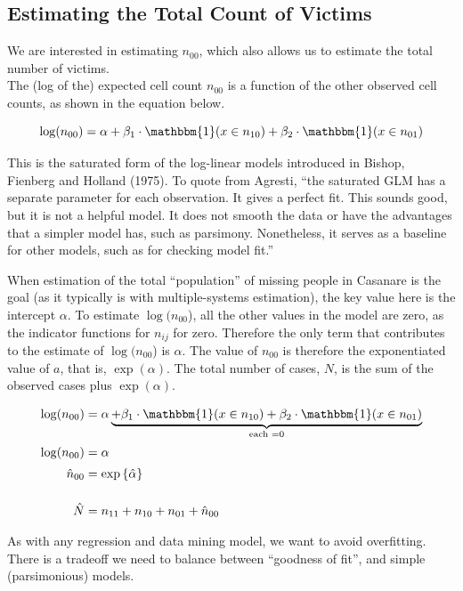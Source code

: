 \documentclass[]{article}
\begin{document}
\hypertarget{estimating-the-total-count-of-victims}{%
\subsection{Estimating the Total Count of
Victims}\label{estimating-the-total-count-of-victims}}

We are interested in estimating \(n_{00}\), which also allows us to
estimate the total number of victims.\\
The (log of the) expected cell count \(n_{00}\) is a function of the
other observed cell counts, as shown in the equation below.

\[
\log(n_{00}) = \alpha 
+ \beta_1 \cdot \mathbbm{1}(x\in n_{10}) 
+ \beta_2 \cdot \mathbbm{1}(x\in n_{01}) 
\]

This is the saturated form of the log-linear models introduced in
Bishop, Fienberg and Holland (1975). To quote from Agresti, ``the
saturated GLM has a separate parameter for each observation. It gives a
perfect fit. This sounds good, but it is not a helpful model. It does
not smooth the data or have the advantages that a simpler model has,
such as parsimony. Nonetheless, it serves as a baseline for other
models, such as for checking model fit.''

When estimation of the total ``population'' of missing people in
Casanare is the goal (as it typically is with multiple-systems
estimation), the key value here is the intercept \(\alpha\). To estimate
\(\log(n_{00}\)), all the other values in the model are zero, as the
indicator functions for \(n_{ij}\) for zero. Therefore the only term
that contributes to the estimate of \(\log(n_{00}\)) is \(\alpha\). The
value of \(n_{00}\) is therefore the exponentiated value of \(a\), that
is, \(\exp(\alpha)\). The total number of cases, \(N\), is the sum of
the observed cases plus \(\exp(\alpha)\).

\[
\begin{aligned}
\log(n_{00}) &= \alpha 
\underbrace{
+ \beta_1 \cdot  \mathbbm{1}(x\in n_{10}) 
+ \beta_2 \cdot \mathbbm{1}(x\in n_{01}) 
}_{\text{each }=0}
\\[.5ex]
\log(n_{00}) & = \alpha 
\\[.5ex]
\hat{n}_{00} & = \exp \left\{ \hat{\alpha} \right\}
\\[3ex]
\hat{N} &= n_{11} + n_{10} + n_{01} + \hat{n}_{00}
\end{aligned}
\]

As with any regression and data mining model, we want to avoid
overfitting. There is a tradeoff we need to balance between ``goodness
of fit'', and simple (parsimonious) models.
\end{document}
